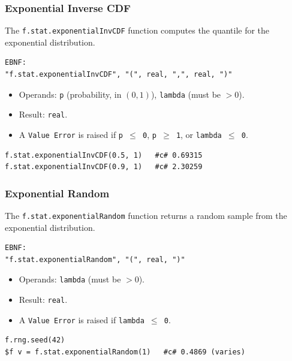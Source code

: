 \subsubsection{Exponential Inverse CDF}
The \texttt{f.stat.exponentialInvCDF} function computes the quantile for the exponential distribution.
\begin{verbatim}
EBNF:
"f.stat.exponentialInvCDF", "(", real, ",", real, ")"
\end{verbatim}
\begin{itemize}
\item Operands: \texttt{p} (probability, in $(0, 1)$), \texttt{lambda} (must be $> 0$).
\item Result: \texttt{real}.
\item A \texttt{Value Error} is raised if \texttt{p $\leq$ 0}, \texttt{p $\geq$ 1}, or \texttt{lambda $\leq$ 0}.
\end{itemize}
\begin{verbatim}
f.stat.exponentialInvCDF(0.5, 1)   #c# 0.69315
f.stat.exponentialInvCDF(0.9, 1)   #c# 2.30259
\end{verbatim}

\subsubsection{Exponential Random}
The \texttt{f.stat.exponentialRandom} function returns a random sample from the exponential distribution.
\begin{verbatim}
EBNF:
"f.stat.exponentialRandom", "(", real, ")"
\end{verbatim}
\begin{itemize}
\item Operands: \texttt{lambda} (must be $> 0$).
\item Result: \texttt{real}.
\item A \texttt{Value Error} is raised if \texttt{lambda $\leq$ 0}.
\end{itemize}
\begin{verbatim}
f.rng.seed(42)
$f v = f.stat.exponentialRandom(1)   #c# 0.4869 (varies)
\end{verbatim}

